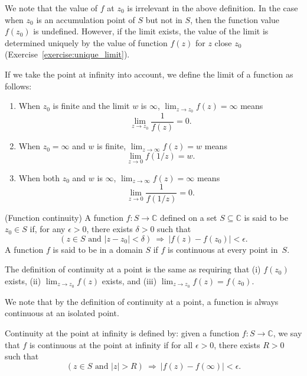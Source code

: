 We note that the value of $f$ at $z_0$ is irrelevant in the above definition. In the case when $z_0$ is an accumulation point of $S$ but not in $S$, then the function value $f(z_0)$ is undefined. However, if the limit exists, the value of the limit is determined uniquely by the value of function $f(z)$ for $z$ close $z_0$ (Exercise~\ref{exercise:unique_limit}).

If we take the point at infinity into account, we define the limit of a function  as follows:

\begin{enumerate}
	\item When $z_0$ is finite and the limit $w$ is $\infty$, $\lim_{z\rightarrow z_0} f(z) =\infty$ means 
	$$
	\lim_{z\rightarrow z_0} \frac{1}{f(z)} = 0. 
	$$
	\item When $z_0=\infty$  and $w$ is finite, $\lim_{z\rightarrow \infty} f(z) = w$ means 
	$$
	\lim_{z\rightarrow 0} f(1/z) = w. 
	$$
	\item When both $z_0$  and  $w$ is $\infty$, $\lim_{z\rightarrow \infty} f(z) =\infty$ means 
	$$
	\lim_{z\rightarrow 0} \frac{1}{f(1/z)} = 0. 
	$$
\end{enumerate}





\begin{svgraybox}
	\begin{definition}  (Function continuity)
		A function $f:S \rightarrow\mathbb{C}$ defined on a set $S\subseteq \mathbb{C}$ is said to be  $z_0 \in S$ if, for any $\epsilon>0$, there exists $\delta>0$ such that
		$$
		(z\in S \text{ and } |z - z_0| <\delta )\ \Rightarrow\ |f(z)-f(z_0)| < \epsilon.
		$$
		A function $f$ is said to be  in a domain $S$ if $f$ is continuous at every point in~$S$. \label{def:continuous_function}
	\end{definition}
\end{svgraybox}

The definition of continuity at a point is the same as requiring that (i) $f(z_0)$ exists, (ii) $\lim_{z\rightarrow z_0} f(z)$ exists, and (iii) $\lim_{z\rightarrow z_0} f(z) = f(z_0)$.

We note that by the definition of continuity at a point, a function is always continuous at an isolated point.

Continuity at the point at infinity is defined by: given a function $f:S\rightarrow\mathbb{C}$, we say that $f$ is continuous at the point at infinity if
for all  $\epsilon>0$, there exists $R>0$ such that
$$
(z\in S \text{ and } |z | >R )\ \Rightarrow\ |f(z)-f(\infty)| < \epsilon.
$$




